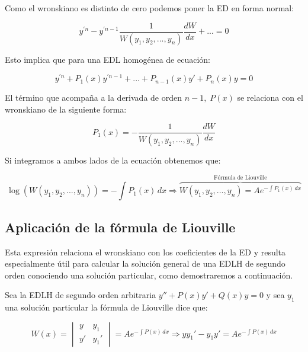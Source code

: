 \documentclass[a4paper,12pt,titlepage]{article}
\begin{document}
Como el wronskiano es distinto de cero podemos poner la ED en forma normal:

\begin{equation}
    y^{'n} - y^{'n-1} \frac{1}{W(y_1,y_2,...,y_n)} \frac{dW}{dx} + ... = 0
\end{equation}

Esto implica que para una EDL homogénea de ecuación:

\begin{equation}
    y^{'n} + P_1(x) y^{'n-1} + ... + P_{n-1}(x)y' + P_n(x) y = 0
\end{equation}

El término que acompaña a la derivada de orden $n-1,\; P(x)$ se relaciona con el wronskiano de la siguiente forma:

\begin{equation}
    P_1(x) = - \frac{1}{W(y_1,y_2,...,y_n)} \frac{dW}{dx} 
\end{equation}

Si integramos a ambos lados de la ecuación obtenemos que:

\begin{equation}
    \log (W(y_1,y_2,...,y_n)) = - \int P_1(x) \,dx \Rightarrow \overbrace{W(y_1,y_2,...,y_n) = A e^{-\int P_1(x) \, dx}}^{\text{Fórmula de Liouville}}
\end{equation}

\subsection{Aplicación de la fórmula de Liouville}

Esta expresión relaciona el wronskiano con los coeficientes de la ED y resulta especialmente útil para calcular la solución general de una EDLH de segundo orden conociendo una solución particular, como demostraremos a continuación. 

\par Sea la EDLH de segundo orden arbitraria $y'' + P(x) y' + Q(x)y = 0$ y sea $y_1$ una solución particular la fórmula de Liouville dice que:

\begin{equation}
    W(x) = \begin{vmatrix}
        y & y_1 \\
        y' & y_1'
    \end{vmatrix} = A e^{-\int P(x)\, dx} \Rightarrow yy_1'-y_1y' = A e^{-\int P(x)\, dx}
\end{equation}
\end{document}
